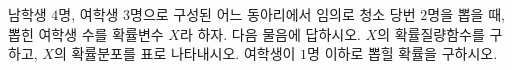 남학생 $4$명, 여학생 $3$명으로 구성된 어느 동아리에서 임의로 청소 당번 $2$명을 뽑을 때, 뽑힌 여학생 수를 확률변수 $X$라 하자. 다음 물음에 답하시오.
 $X$의 확률질량함수를 구하고, $X$의 확률분포를 표로 나타내시오.
 여학생이 $1$명 이하로 뽑힐 확률을 구하시오.
